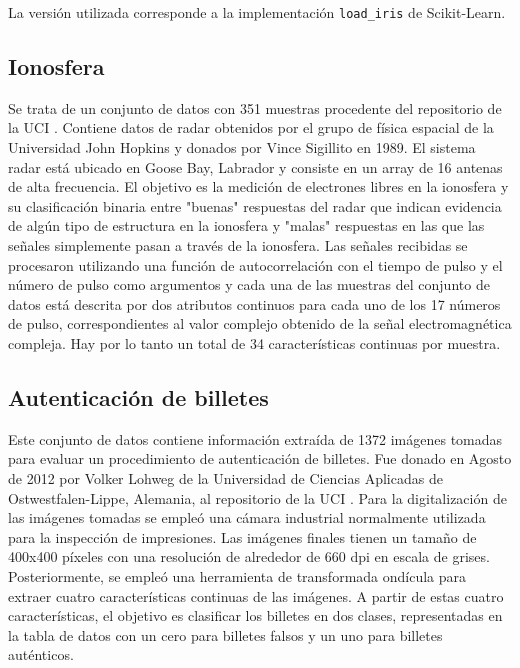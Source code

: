 La versión utilizada corresponde a la implementación \texttt{load\_iris} de Scikit-Learn.

\subsection{Ionosfera}

Se trata de un conjunto de datos con 351 muestras procedente del repositorio de la UCI \cite{ionosphere-dataset}. Contiene datos de radar obtenidos por el grupo de física espacial de la Universidad John Hopkins y donados por Vince Sigillito en 1989. El sistema radar está ubicado en Goose Bay, Labrador y consiste en un array de 16 antenas de alta frecuencia. El objetivo es la medición de electrones libres en la ionosfera y su clasificación binaria entre "buenas" respuestas del radar que indican evidencia de algún tipo de estructura en la ionosfera y "malas" respuestas en las que las señales simplemente pasan a través de la ionosfera. Las señales recibidas se procesaron utilizando una función de autocorrelación con el tiempo de pulso y el número de pulso como argumentos y cada una de las muestras del conjunto de datos está descrita por dos atributos continuos para cada uno de los 17 números de pulso, correspondientes al valor complejo obtenido de la señal electromagnética compleja. Hay por lo tanto un total de 34 características continuas por muestra.

\subsection{Autenticación de billetes}

Este conjunto de datos contiene información extraída de 1372 imágenes tomadas para evaluar un procedimiento de autenticación de billetes. Fue donado en Agosto de 2012 por Volker Lohweg de la Universidad de Ciencias Aplicadas de Ostwestfalen-Lippe, Alemania, al repositorio de la UCI \cite{banknote-dataset}. Para la digitalización de las imágenes tomadas se empleó una cámara industrial normalmente utilizada para la inspección de impresiones. Las imágenes finales tienen un tamaño de 400x400 píxeles con una resolución de alrededor de 660 dpi en escala de grises. Posteriormente, se empleó una herramienta de transformada ondícula para extraer cuatro características continuas de las imágenes. A partir de estas cuatro características, el objetivo es clasificar los billetes en dos clases, representadas en la tabla de datos con un cero para billetes falsos y un uno para billetes auténticos.

